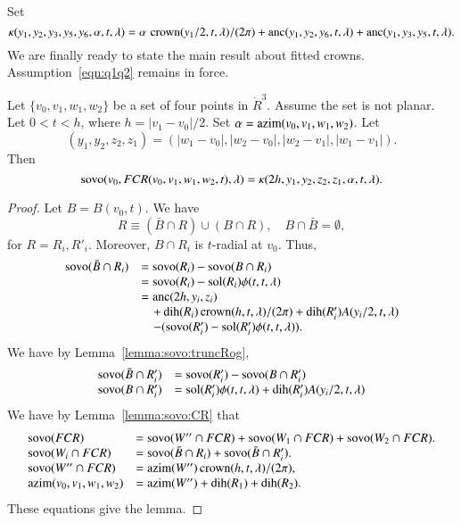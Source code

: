 Set
    $$\kappa(y_1,y_2,y_3,y_5,y_6,\alpha,t,\lambda) =
   \alpha\,\operatorname{crown}(y_1/2,t,\lambda)/(2\pi) +
        \operatorname{anc}(y_1,y_2,y_6,t,\lambda)+\operatorname{anc}(y_1,y_3,y_5,t,\lambda).
    $$
We are finally ready to state the main result about fitted crowns.
Assumption~\ref{eqn:q1q2} remains in force.

\begin{lemma}\label{lemma:sovo:FCR}
Let $\{v_0,v_1,w_1,w_2\}$ be a set of four points in $\ring{R}^3$.
Assume the set is not planar.
Let $0 < t < h$, where $h = |v_1-v_0|/2$.
Set $\alpha = {\operatorname{azim}}(v_0,v_1,w_1,w_2)$.
Let 
 $$(y_1,y_2,z_2,z_1) =
   (|w_1-v_0|,|w_2-v_0|,|w_2-v_1|,|w_1-v_1|).
 $$
Then
$$
{\operatorname{sovo}}(v_0,FCR(v_0,v_1,w_1,w_2,t),\lambda) =
 \kappa(2h,y_1,y_2,z_2,z_1,\alpha,t,\lambda).
$$
\end{lemma}

\begin{proof}
Let $B = B(v_0,t)$.  We have
$$R\equiv (\bar B\cap R) \cup (B\cap R),\quad B\cap \bar B = \emptyset,
$$
for $R=R_i,R'_i$.  Moreover, $B\cap R_i$ is $t$-radial at $v_0$.
Thus, 
 $$
\begin{array}{lll}
 {\operatorname{sovo}}(\bar B\cap R_i) &= {\operatorname{sovo}}(R_i) - {\operatorname{sovo}}(B\cap R_i)\\
 &= {\operatorname{sovo}}(R_i) - \operatorname{sol}(R_i)\phi(t,t,\lambda) \\
 &= {\operatorname{anc}}(2h,y_i,z_i) \\
    &\quad + \operatorname{dih}(R_i)\operatorname{crown}(h,t,\lambda)/(2\pi) + \operatorname{dih}(R'_i) A(y_i/2,t,\lambda)\\
  &\quad -({\operatorname{sovo}}(R_i') -\operatorname{sol}(R_i')\phi(t,t,\lambda)). \\
\end{array}
 $$
We have by Lemma~\ref{lemma:sovo:truncRog}, 
$$
\begin{array}{lll}
{\operatorname{sovo}}(\bar B\cap R_i') &= {\operatorname{sovo}}(R'_i) - {\operatorname{sovo}}(B\cap R'_i)\\
{\operatorname{sovo}}(B\cap R'_i) &= \operatorname{sol}(R'_i)\phi(t,t,\lambda) + \operatorname{dih}(R'_i) A(y_i/2,t,\lambda)\\
\end{array}
$$
We have by Lemma~\ref{lemma:sovo:CR} that
$$
\begin{array}{lll}
{\operatorname{sovo}}(FCR) &= {\operatorname{sovo}}(W''\cap FCR) + {\operatorname{sovo}}(W_1\cap FCR)
 +{\operatorname{sovo}}(W_2\cap FCR).\\
{\operatorname{sovo}}(W_i\cap FCR) &= {\operatorname{sovo}}(\bar B\cap R_i) + {\operatorname{sovo}}(\bar B\cap R'_i).\\
 {\operatorname{sovo}}(W''\cap FCR) &= {\operatorname{azim}}(W'')\operatorname{crown}(h,t,\lambda)/(2\pi),\\
{\operatorname{azim}}(v_0,v_1,w_1,w_2)&= {\operatorname{azim}}(W'')+\operatorname{dih}(R_1)+\operatorname{dih}(R_2).\\
\end{array}
$$
These equations give the lemma.
\end{proof}

